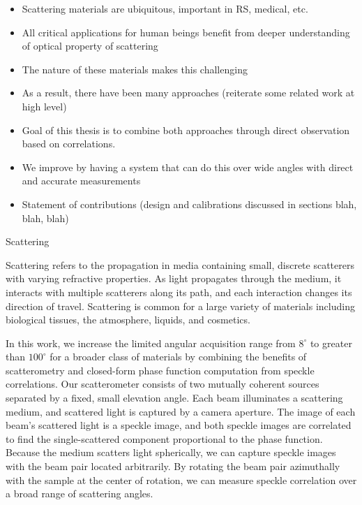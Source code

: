 \begin{itemize}
    \item Scattering materials are ubiquitous, important in RS, medical, etc.
    \item All critical applications for human beings benefit from deeper understanding of optical property of scattering
    \item The nature of these materials makes this challenging
    \item As a result, there have been many approaches (reiterate some related work at high level)
    \item Goal of this thesis is to combine both approaches through direct observation based on correlations.
    \item We improve by having a system that can do this over wide angles with direct and accurate measurements
    \item Statement of contributions (design and calibrations discussed in sections blah, blah, blah)
\end{itemize}

Scattering


Scattering refers to the propagation in media containing small, discrete scatterers with varying refractive properties. As light propagates through the medium, it interacts with multiple scatterers along its path, and each interaction changes its direction of travel. Scattering is common for a large variety of materials including biological tissues, the atmosphere, liquids, and cosmetics.

In this work, we increase the limited angular acquisition range from $8^\circ$ to greater than $100^\circ$ for a broader class of materials by combining the benefits of scatterometry and closed-form phase function computation from speckle correlations. Our scatterometer consists of two mutually coherent sources separated by a fixed, small elevation angle. Each beam illuminates a scattering medium, and scattered light is captured by a camera aperture. The image of each beam's scattered light is a speckle image, and both speckle images are correlated to find the single-scattered component proportional to the phase function. Because the medium scatters light spherically, we can capture speckle images with the beam pair located arbitrarily. By rotating the beam pair azimuthally with the sample at the center of rotation, we can measure speckle correlation over a broad range of scattering angles.